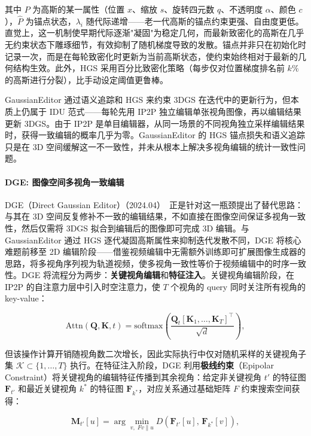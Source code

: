其中 $P$ 为高斯的某一属性（位置 $x$、缩放 $s$、旋转四元数 $q$、不透明度 $\alpha$、颜色 $c$），$\hat{P}$ 为锚点状态，$\lambda_i$ 随代际递增——老一代高斯的锚点约束更强、自由度更低。直觉上，这一机制使早期代际逐渐"凝固"为稳定几何，而最新致密化的高斯在几乎无约束状态下雕琢细节，有效抑制了随机梯度导致的发散。锚点并非只在初始化时记录一次，而是在每轮致密化时更新为当前高斯状态，使约束始终相对于最新的几何结构生效。此外，HGS 采用百分比致密化策略（每步仅对位置梯度排名前 $k\%$ 的高斯进行分裂），比手动设定阈值更鲁棒。

GaussianEditor 通过语义追踪和 HGS 来约束 3DGS 在迭代中的更新行为，但本质上仍属于 IDU 范式——每轮先用 IP2P 独立编辑单张视角图像，再以编辑结果更新 3DGS。由于 IP2P 是单目编辑器，从同一场景的不同视角独立采样编辑结果时，获得一致编辑的概率几乎为零。GaussianEditor 的 HGS 锚点损失和语义追踪只是在 3D 空间缓解这一不一致性，并未从根本上解决多视角编辑的统计一致性问题。

\paragraph{DGE: 图像空间多视角一致编辑}

DGE（Direct Gaussian Editor）（2024.04）~\cite{2404_18929}正是针对这一瓶颈提出了替代思路：与其在 3D 空间反复修补不一致的编辑结果，不如直接在图像空间保证多视角一致性，然后仅需将 3DGS 拟合到编辑后的图像即可完成 3D 编辑。与 GaussianEditor 通过 HGS 逐代凝固高斯属性来抑制迭代发散不同，DGE 将核心难题前移至 2D 编辑阶段——借鉴视频编辑中无需额外训练即可扩展图像生成器的思路，将多视角序列视为轨道视频，使多视角一致性等价于视频编辑中的时序一致性。DGE 将流程分为两步：\textbf{关键视角编辑}和\textbf{特征注入}。关键视角编辑阶段，在 IP2P 的自注意力层中引入时空注意力，使 $T$ 个视角的 query 同时关注所有视角的 key-value：

\begin{equation}
  \text{Attn}(\mathbf{Q}, \mathbf{K}, t) = \text{softmax}\!\left( \frac{\mathbf{Q}_t [\mathbf{K}_1, \ldots, \mathbf{K}_T]^\top}{\sqrt{d}} \right),
\end{equation}

但该操作计算开销随视角数二次增长，因此实际执行中仅对随机采样的关键视角子集 $\mathcal{K} \subset \{1, \ldots, T\}$ 执行。在特征注入阶段，DGE 利用\textbf{极线约束}（Epipolar Constraint）将关键视角的编辑特征传播到其余视角：给定非关键视角 $t'$ 的特征图 $\mathbf{F}_{t'}$ 和最近关键视角 $k^*$ 的特征图 $\mathbf{F}_{k^*}$，对应关系通过基础矩阵 $F$ 约束搜索空间获得：

\begin{equation}
  \mathbf{M}_{t'}[u] = \arg\min_{v,\; Fv \parallel u} D\!\left( \mathbf{F}_{t'}[u],\, \mathbf{F}_{k^*}[v] \right),
\end{equation}

